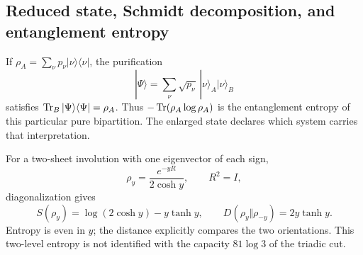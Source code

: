 

\subsection{Reduced state, Schmidt decomposition, and entanglement entropy}
If $\rho_A=\sum_\nu p_\nu|\nu\rangle\langle\nu|$,
the purification
\[
|\Psi\rangle=\sum_\nu\sqrt{p_\nu}\,
|\nu\rangle_A|\nu\rangle_B
\]
satisfies $\operatorname{Tr}_B|\Psi\rangle\langle\Psi|=\rho_A$.
Thus $-\operatorname{Tr}(\rho_A\log\rho_A)$ is the entanglement entropy
of this particular pure bipartition. The enlarged state declares
which system carries that interpretation.

For a two-sheet involution with one eigenvector of each sign,
\[
\rho_y=\frac{e^{-yR}}{2\cosh y},\qquad R^2=I,
\]
diagonalization gives
\[
S(\rho_y)=\log(2\cosh y)-y\tanh y,\qquad
D(\rho_y\Vert\rho_{-y})=2y\tanh y.
\]
Entropy is even in $y$; the distance explicitly compares
the two orientations. This two-level entropy is not identified
with the capacity $81\log3$ of the triadic cut.
